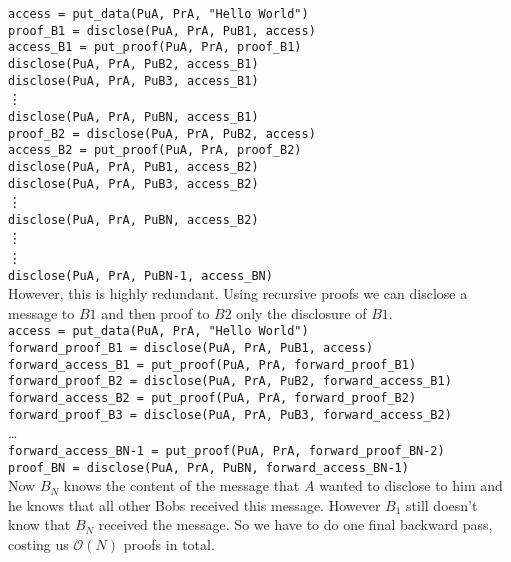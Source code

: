\documentclass[a4paper]{article} %
\begin{document}
\lstinline{access = put_data(PuA, PrA, "Hello World")}\\
\lstinline{proof_B1 = disclose(PuA, PrA, PuB1, access)}\\
\lstinline{access_B1 = put_proof(PuA, PrA, proof_B1)}\\
\lstinline{disclose(PuA, PrA, PuB2, access_B1)}\\
\lstinline{disclose(PuA, PrA, PuB3, access_B1)}\\
\vdots\\
\lstinline{disclose(PuA, PrA, PuBN, access_B1)}\\
\lstinline{proof_B2 = disclose(PuA, PrA, PuB2, access)}\\
\lstinline{access_B2 = put_proof(PuA, PrA, proof_B2)}\\
\lstinline{disclose(PuA, PrA, PuB1, access_B2)}\\
\lstinline{disclose(PuA, PrA, PuB3, access_B2)}\\
\vdots\\
\lstinline{disclose(PuA, PrA, PuBN, access_B2)}\\
\vdots\\
\vdots\\
\lstinline{disclose(PuA, PrA, PuBN-1, access_BN)}\\

However, this is highly redundant. Using recursive proofs we can disclose a message to $B1$ and then proof to $B2$ only the disclosure of $B1$. \\
\lstinline{access = put_data(PuA, PrA, "Hello World")} \\
\lstinline{forward_proof_B1 = disclose(PuA, PrA, PuB1, access)}\\
\lstinline{forward_access_B1 = put_proof(PuA, PrA, forward_proof_B1)}\\
\lstinline{forward_proof_B2 = disclose(PuA, PrA, PuB2, forward_access_B1)}\\
\lstinline{forward_access_B2 = put_proof(PuA, PrA, forward_proof_B2)}\\
\lstinline{forward_proof_B3 = disclose(PuA, PrA, PuB3, forward_access_B2)}\\
\ldots\\
\lstinline{forward_access_BN-1 = put_proof(PuA, PrA, forward_proof_BN-2)}\\
\lstinline{proof_BN = disclose(PuA, PrA, PuBN, forward_access_BN-1)}\\

Now $B_{N}$ knows the content of the message that $A$ wanted to disclose to him and he knows that all other Bobs received this message.
However $B_1$ still doesn't know that $B_N$ received the message. So we have to do one final backward pass, costing us $\mathcal{O}(N)$ proofs in total.
\end{document}
